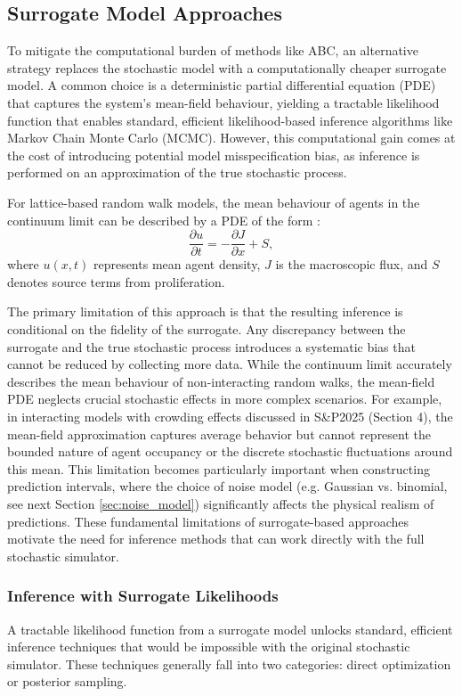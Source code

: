 \documentclass{article}
\begin{document}
\subsection{Surrogate Model Approaches}
To mitigate the computational burden of methods like ABC, an alternative strategy replaces the stochastic model with a computationally cheaper surrogate model. A common choice is a deterministic partial differential equation (PDE) that captures the system's mean-field behaviour, yielding a tractable likelihood function that enables standard, efficient likelihood-based inference algorithms like Markov Chain Monte Carlo (MCMC). However, this computational gain comes at the cost of introducing potential model misspecification bias, as inference is performed on an approximation of the true stochastic process.

For lattice-based random walk models, the mean behaviour of agents in the continuum limit can be described by a PDE of the form \citep{Codling2008,Simpson2025.05.25.656057,Plank2025}:
\begin{equation}
	\frac{\partial u}{\partial t} = -\frac{\partial J}{\partial x} + S,
\end{equation}
where $u(x,t)$ represents mean agent density, $J$ is the macroscopic flux, and $S$ denotes source terms from proliferation.

The primary limitation of this approach is that the resulting inference is conditional on the fidelity of the surrogate. Any discrepancy between the surrogate and the true stochastic process introduces a systematic bias that cannot be reduced by collecting more data. While the continuum limit accurately describes the mean behaviour of non-interacting random walks, the mean-field PDE neglects crucial stochastic effects in more complex scenarios. For example, in interacting models with crowding effects discussed in S\&P2025 (Section 4), the mean-field approximation captures average behavior but cannot represent the bounded nature of agent occupancy or the discrete stochastic fluctuations around this mean. This limitation becomes particularly important when constructing prediction intervals, where the choice of noise model (e.g. Gaussian vs. binomial, see next Section \ref{sec:noise_model}) significantly affects the physical realism of predictions. These fundamental limitations of surrogate-based approaches motivate the need for inference methods that can work directly with the full stochastic simulator.



\subsubsection{Inference with Surrogate Likelihoods}
A tractable likelihood function from a surrogate model unlocks standard, efficient inference techniques that would be impossible with the original stochastic simulator. These techniques generally fall into two categories: direct optimization or posterior sampling.
\end{document}
